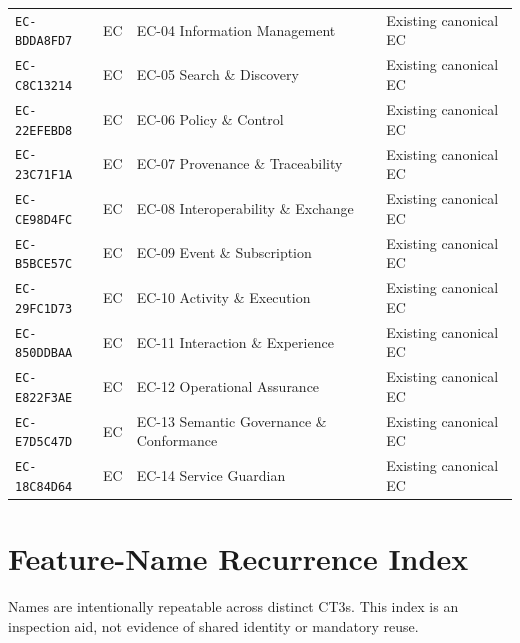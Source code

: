 \documentclass[11pt,a4paper,openany]{book}
\begin{document}
\begin{longtable}{@{}p{.19\linewidth}p{.12\linewidth}p{.39\linewidth}p{.24\linewidth}@{}}
\texttt{EC-BDDA8FD7} & EC & EC-04 Information Management & Existing canonical EC \\
\texttt{EC-C8C13214} & EC & EC-05 Search \& Discovery & Existing canonical EC \\
\texttt{EC-22EFEBD8} & EC & EC-06 Policy \& Control & Existing canonical EC \\
\texttt{EC-23C71F1A} & EC & EC-07 Provenance \& Traceability & Existing canonical EC \\
\texttt{EC-CE98D4FC} & EC & EC-08 Interoperability \& Exchange & Existing canonical EC \\
\texttt{EC-B5BCE57C} & EC & EC-09 Event \& Subscription & Existing canonical EC \\
\texttt{EC-29FC1D73} & EC & EC-10 Activity \& Execution & Existing canonical EC \\
\texttt{EC-850DDBAA} & EC & EC-11 Interaction \& Experience & Existing canonical EC \\
\texttt{EC-E822F3AE} & EC & EC-12 Operational Assurance & Existing canonical EC \\
\texttt{EC-E7D5C47D} & EC & EC-13 Semantic Governance \& Conformance & Existing canonical EC \\
\texttt{EC-18C84D64} & EC & EC-14 Service Guardian & Existing canonical EC \\
\bottomrule\end{longtable}\normalsize
\chapter{Feature-Name Recurrence Index}
Names are intentionally repeatable across distinct CT3s. This index is an inspection aid, not evidence of shared identity or mandatory reuse.
\end{document}

